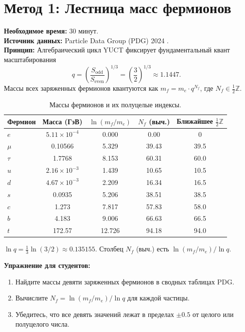 \documentclass[12pt,a4paper]{article}
\newcommand{\Sodd}{S_{\mathrm{odd}}}
\newcommand{\Seven}{S_{\mathrm{even}}}
\begin{document}
	\section{Метод 1: Лестница масс фермионов}
	\label{sec:massladder}
	
	\textbf{Необходимое время:} 30 минут.\\
	\textbf{Источник данных:} Particle Data Group (PDG) 2024 \cite{PDG2024}.\\
	\textbf{Принцип:} Алгебраический цикл YUCT фиксирует фундаментальный
	квант масштабирования
	\[
	q = \left( \frac{\Sodd}{\Seven} \right)^{1/3} = \left( \frac{3}{2} \right)^{1/3} \approx 1.1447.
	\]
	Массы всех заряженных фермионов квантуются как \(m_f = m_e \cdot q^{N_f}\),
	где \(N_f \in \frac{1}{2}\mathbb{Z}\).
	
	\begin{table}[H]
		\centering
		\caption{Массы фермионов и их полуцелые индексы.}
		\label{tab:fermions}
		\begin{tabular}{l c c c c}
			\toprule
			Фермион & Масса (ГэВ) & \(\ln(m_f/m_e)\) & \(N_f\) (выч.) & Ближайшее \(\frac{1}{2}\mathbb{Z}\) \\
			\midrule
			\(e\)   & \(5.11\times10^{-4}\) & 0.000  & 0.00  & 0 \\
			\(\mu\)  & 0.10566 & 5.329  & 39.43 & 39.5 \\
			\(\tau\) & 1.7768  & 8.153  & 60.31 & 60.0 \\
			\(u\)   & \(2.16\times10^{-3}\) & 1.439  & 10.65 & 10.5 \\
			\(d\)   & \(4.67\times10^{-3}\) & 2.209  & 16.34 & 16.5 \\
			\(s\)   & 0.0935  & 5.206  & 38.51 & 38.5 \\
			\(c\)   & 1.273   & 7.817  & 57.83 & 58.0 \\
			\(b\)   & 4.183   & 9.006  & 66.63 & 66.5 \\
			\(t\)   & 172.57  & 12.726 & 94.18 & 94.0 \\
			\bottomrule
		\end{tabular}
		\par\smallskip
		\footnotesize
		\(\ln q = \frac{1}{3}\ln(3/2) \approx 0.135155\). Столбец \(N_f\) (выч.) есть \(\ln(m_f/m_e)/\ln q\).
	\end{table}
	
	\textbf{Упражнение для студентов:}
	\begin{enumerate}[label=(\arabic*)]
		\item Найдите массы девяти заряженных фермионов в сводных таблицах PDG.
		\item Вычислите \(N_f = \ln(m_f / m_e) / \ln q\) для каждой частицы.
		\item Убедитесь, что все девять значений лежат в пределах \(\pm 0.5\) от целого или полуцелого числа.
	\end{enumerate}
	
\end{document}
